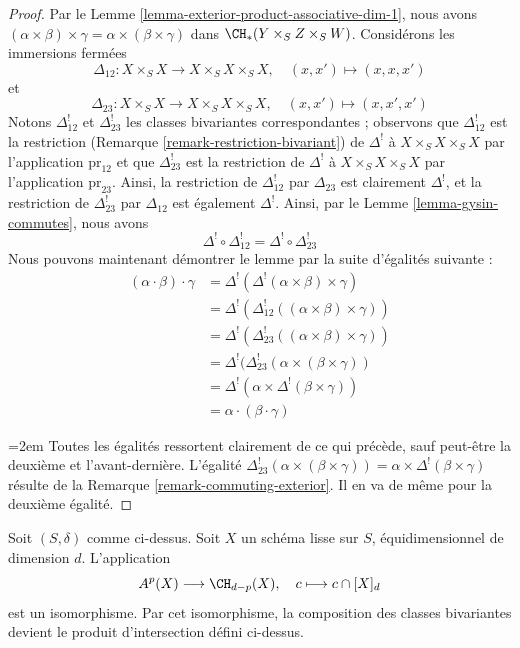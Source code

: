\begin{proof}
Par le Lemme \ref{lemma-exterior-product-associative-dim-1}, nous avons
$(\alpha \times \beta) \times \gamma =
\alpha \times (\beta \times \gamma)$ dans $\CH_*(Y \times_S Z \times_S W)$.
Considérons les immersions fermées
$$
\Delta_{12} : X \times_S X \longrightarrow X \times_S X \times_S X,
\quad (x, x') \mapsto (x, x, x')
$$
et
$$
\Delta_{23} : X \times_S X \longrightarrow X \times_S X \times_S X,
\quad (x, x') \mapsto (x, x', x')
$$
Notons $\Delta_{12}^!$ et $\Delta_{23}^!$ les classes bivariantes
correspondantes ; observons que $\Delta_{12}^!$ est la restriction
(Remarque \ref{remark-restriction-bivariant}) de $\Delta^!$
à $X \times_S X \times_S X$ par l'application $\text{pr}_{12}$ et que
$\Delta_{23}^!$ est la restriction de $\Delta^!$
à $X \times_S X \times_S X$ par l'application $\text{pr}_{23}$.
Ainsi, la restriction de $\Delta_{12}^!$ par $\Delta_{23}$
est clairement $\Delta^!$, et la restriction de $\Delta_{23}^!$ par $\Delta_{12}$ est
également $\Delta^!$. Ainsi, par le Lemme \ref{lemma-gysin-commutes}, nous avons
$$
\Delta^! \circ \Delta_{12}^! =
\Delta^! \circ \Delta_{23}^! 
$$
Nous pouvons maintenant démontrer le lemme par la suite d'égalités suivante :
\begin{align*}
(\alpha \cdot \beta) \cdot \gamma
& =
\Delta^!(\Delta^!(\alpha \times \beta) \times \gamma) \\
& =
\Delta^!(\Delta_{12}^!((\alpha \times \beta) \times \gamma)) \\
& =
\Delta^!(\Delta_{23}^!((\alpha \times \beta) \times \gamma)) \\
& =
\Delta^!(\Delta_{23}^!(\alpha \times (\beta \times \gamma)) \\
& =
\Delta^!(\alpha \times \Delta^!(\beta \times \gamma)) \\
& =
\alpha \cdot (\beta \cdot \gamma)
\end{align*}
{\emergencystretch=2em Toutes les égalités ressortent clairement de ce qui précède, sauf peut-être
la deuxième et l'avant-dernière. L'égalité
$\Delta_{23}^!(\alpha \times (\beta \times \gamma)) =
\alpha \times \Delta^!(\beta \times \gamma)$ résulte de la
Remarque \ref{remark-commuting-exterior}. Il en va de même pour la deuxième
égalité.\par}
\end{proof}

\begin{lemma}
\label{lemma-identify-chow-for-smooth-dim-1}
Soit $(S, \delta)$ comme ci-dessus. Soit $X$ un schéma lisse sur $S$,
équidimensionnel de dimension $d$. L'application
$$
A^p(X) \longrightarrow \CH_{d - p}(X),\quad
c \longmapsto c \cap [X]_d
$$
est un isomorphisme. Par cet isomorphisme, la composition des classes
bivariantes devient le produit d'intersection défini ci-dessus.
\end{lemma}

